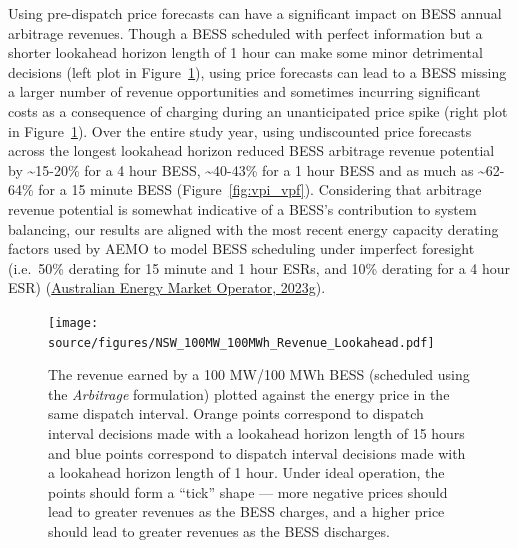 \documentclass[12pt,a4paper,]{report}
\begin{document}
Using pre-dispatch price forecasts can have a significant impact on BESS
annual arbitrage revenues. Though a BESS scheduled with perfect
information but a shorter lookahead horizon length of 1 hour can make
some minor detrimental decisions (left plot in
Figure~\ref{fig:bess_price_revenue}), using price forecasts can lead to
a BESS missing a larger number of revenue opportunities and sometimes
incurring significant costs as a consequence of charging during an
unanticipated price spike (right plot in
Figure~\ref{fig:bess_price_revenue}). Over the entire study year, using
undiscounted price forecasts across the longest lookahead horizon
reduced BESS arbitrage revenue potential by \textasciitilde15-20\% for a
4 hour BESS, \textasciitilde40-43\% for a 1 hour BESS and as much as
\textasciitilde62-64\% for a 15 minute BESS (Figure~\ref{fig:vpi_vpf}).
Considering that arbitrage revenue potential is somewhat indicative of a
BESS's contribution to system balancing, our results are aligned with
the most recent energy capacity derating factors used by AEMO to model
BESS scheduling under imperfect foresight (i.e.~50\% derating for 15
minute and 1 hour ESRs, and 10\% derating for a 4 hour ESR)
(\protect\hyperlink{ref-australianenergymarketoperator2023ElectricityStatement2023}{Australian
Energy Market Operator, 2023g}).

\begin{figure}
\hypertarget{fig:bess_price_revenue}{%
\centering
\texttt{[image: source/figures/NSW\_100MW\_100MWh\_Revenue\_Lookahead.pdf]}
\caption{The revenue earned by a 100 MW/100 MWh BESS (scheduled using
the \emph{Arbitrage} formulation) plotted against the energy price in
the same dispatch interval. Orange points correspond to dispatch
interval decisions made with a lookahead horizon length of 15 hours and
blue points correspond to dispatch interval decisions made with a
lookahead horizon length of 1 hour. Under ideal operation, the points
should form a ``tick'' shape --- more negative prices should lead to
greater revenues as the BESS charges, and a higher price should lead to
greater revenues as the BESS discharges.}\label{fig:bess_price_revenue}
}
\end{figure}
\end{document}
